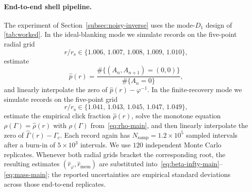 \paragraph{End-to-end shell pipeline.} The experiment of Section~\ref{subsec:noisy-inverse} uses the mode-$D_1$ design of \cref{tab:worked}. In the ideal-blanking mode we simulate records on the five-point radial grid
\[
r/r_{\mathrm s}\in\{1.006,\,1.007,\,1.008,\,1.009,\,1.010\},
\]
estimate
\[
\widehat p(r)=\frac{\#\{(A_n,A_{n+1})=(0,0)\}}{\#\{A_n=0\}},
\]
and linearly interpolate the zero of $\widehat p(r)-\varphi^{-1}$. In the finite-recovery mode we simulate records on the five-point grid
\[
r/r_{\mathrm s}\in\{1.041,\,1.043,\,1.045,\,1.047,\,1.049\},
\]
estimate the empirical click fraction $\widehat\rho(r)$, solve the monotone equation $\rho(\Gamma)=\widehat\rho(r)$ with $\rho(\Gamma)$ from~\eqref{eq:rho-main}, and then linearly interpolate the zero of $\widehat\Gamma(r)-\Gamma_c$. Each record again has $N_{\mathrm{samp}}=1.2\times10^5$ sampled intervals after a burn-in of $5\times10^3$ intervals. We use $120$ independent Monte Carlo replicates. Whenever both radial grids bracket the corresponding root, the resulting estimates $(\widehat r_\varphi,\widehat r_{\mathrm{mem}})$ are substituted into~\eqref{eq:beta-infty-main}--\eqref{eq:mass-main}; the reported uncertainties are empirical standard deviations across those end-to-end replicates.
